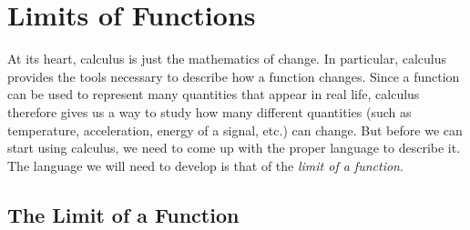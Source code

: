\documentclass[10pt,]{book}
\numberwithin{equation}{section}
\begin{document}
%
%
\typeout{************************************************}
\typeout{************************************************}
%
\chapter[{Limits of Functions}]{Limits of Functions}\label{limits}
\begin{introduction}{}%
\hypertarget{p-1}{}%
At its heart, calculus is just the mathematics of change. In particular, calculus provides the tools necessary to describe how a function changes. Since a function can be used to represent many quantities that appear in real life, calculus therefore gives us a way to study how many different quantities (such as temperature, acceleration, energy of a signal, etc.) can change. But before we can start using calculus, we need to come up with the proper language to describe it. The language we will need to develop is that of the \emph{limit of a function}.%
\end{introduction}%
%
%
\typeout{************************************************}
\typeout{************************************************}
%
\section[{The Limit of a Function}]{The Limit of a Function}\label{section-the-limit-of-a-function}
%
%
\typeout{************************************************}
\typeout{************************************************}
%
\end{document}
